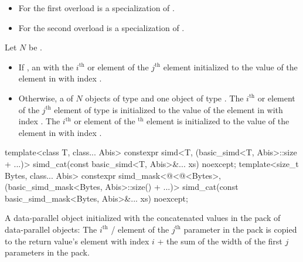 \begin{itemdescr}

  \pnum\constraints
  \begin{itemize}
    \item For the first overload  is a specialization of .
    \item For the second overload  is a specialization of .
  \end{itemize}

  \pnum Let $N$ be .

    \pnum\returns
    \begin{itemize}
      \item If , an  with
        the $i^\text{th}$ \simd or \mask element of the $j^\text{th}$ 
        element initialized to the value of the element in  with index
        .

      \item Otherwise, a  of $N$ objects of type  and one
        object of type .
        The $i^\text{th}$ \simd or \mask element of the $j^\text{th}$
         element of type  is initialized to the value of
        the element in  with index .
        The $i^\text{th}$ \simd or \mask element of the $^\text{th}$
         element is initialized to the value of the element in
         with index .
    \end{itemize}
  \end{itemdescr}

\begin{itemdecl}
template<class T, class... Abis>
  constexpr simd<T, (basic_simd<T, Abis>::size + ...)>
    simd_cat(const basic_simd<T, Abis>&... xs) noexcept;
template<size_t Bytes, class... Abis>
  constexpr simd_mask<@\deducet@<@\integerfrom@<Bytes>, (basic_simd_mask<Bytes, Abis>::size() + ...)>
    simd_cat(const basic_simd_mask<Bytes, Abis>&... xs) noexcept;

\end{itemdecl}

\begin{itemdescr}
  \pnum\returns
  A data-parallel object initialized with the concatenated values in the  pack of data-parallel objects: The $i^\text{th}$ / element of the $j^\text{th}$ parameter in the  pack is copied to the return value's element with index $i$ + the sum of the width of the first $j$ parameters in the  pack.
\end{itemdescr}

